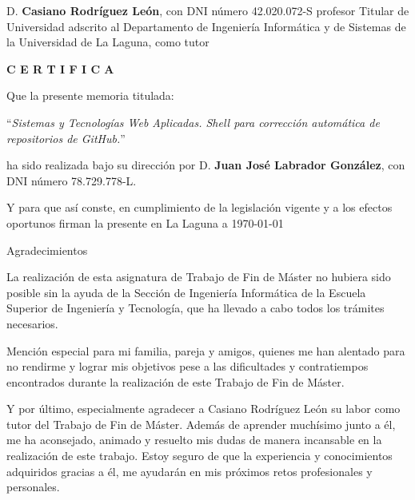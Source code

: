 \documentclass[spanish,a4paper,14pt,oneside]{extreport}
\begin{document}
\newpage
\thispagestyle{empty}

D. {\bf Casiano Rodríguez León}, con DNI número 42.020.072-S
profesor
Titular de Universidad
adscrito al Departamento
de Ingeniería Informática y de Sistemas
de la Universidad de La Laguna, como tutor

\bigskip
\bigskip
{\bf C E R T I F I C A }

\bigskip
\bigskip
\bigskip
Que la presente memoria titulada:

\bigskip
``{\it Sistemas y Tecnologías Web Aplicadas. Shell para corrección automática de repositorios de GitHub.}''

\bigskip
\bigskip
\bigskip

\noindent ha sido realizada bajo su dirección por D. {\bf Juan José Labrador González},
con DNI número 78.729.778-L.

\bigskip
\bigskip

Y para que así conste, en cumplimiento de la legislación vigente y a los efectos
oportunos firman la presente en La Laguna a \today

\newpage
\thispagestyle{empty}

{ \flushright

\begin{LARGE}
Agradecimientos
\end{LARGE}

\hspace{3mm}

\begin{large}


\hspace{3mm}
La realización de esta asignatura de Trabajo de Fin de Máster no hubiera sido posible sin 
la ayuda de la Sección de Ingeniería Informática de la Escuela Superior de Ingeniería 
y Tecnología, que ha llevado a cabo todos los trámites necesarios.
\bigskip

\hspace{3mm}
Mención especial para mi familia, pareja y amigos, quienes me han alentado para no rendirme y lograr mis objetivos pese a las dificultades y contratiempos encontrados durante la realización de este Trabajo de Fin de Máster.
\bigskip

\hspace{3mm}
Y por último, especialmente agradecer a Casiano Rodríguez León su labor como tutor del 
Trabajo de Fin de Máster. Además de aprender muchísimo junto a él, me ha aconsejado, animado y resuelto mis 
dudas de manera incansable en la realización de este trabajo. Estoy seguro de que la experiencia y conocimientos adquiridos gracias a él, me ayudarán en mis próximos retos profesionales y personales.


\end{large}

}
\end{document}
